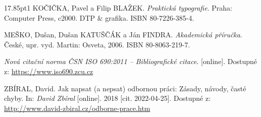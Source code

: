\begin{hangparas}{17.85pt}{1}
\noindent KOČIČKA, Pavel a Filip BLAŽEK. \textit{Praktická typografie}. Praha: Computer Press, c2000. DTP \& grafika. ISBN 80-7226-385-4.

\noindent MEŠKO, Dušan, Dušan KATUŠČÁK a Ján FINDRA. \textit{Akademická příručka}. České, upr. vyd. Martin: Osveta, 2006. ISBN 80-8063-219-7.

\noindent \textit{Nová citační norma ČSN ISO 690:2011 – Bibliografické citace}. [online]. Dostupné z: \url{https://www.iso690.zcu.cz}

\noindent ZBÍRAL, David. Jak napsat (a nepsat) odbornou práci: Zásady, návody, časté chyby. In: \textit{David Zbíral} [online]. 2018 [cit. 2022-04-25]. Dostupné z: \url{http://www.david-zbiral.cz/odborne-prace.htm}
\end{hangparas}
\endgroup

\pagebreak
